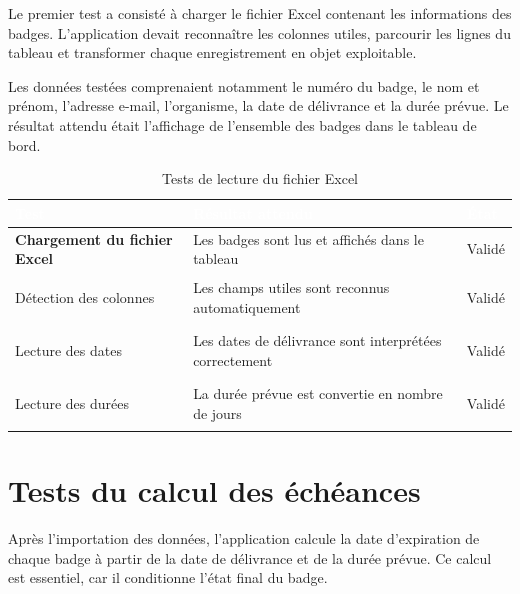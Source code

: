 \documentclass[12pt,a4paper,openany]{report}
\begin{document}
Le premier test a consisté à charger le fichier Excel contenant les informations
des badges. L'application devait reconnaître les colonnes utiles, parcourir les
lignes du tableau et transformer chaque enregistrement en objet exploitable.

Les données testées comprenaient notamment le numéro du badge, le nom et prénom,
l'adresse e-mail, l'organisme, la date de délivrance et la durée prévue. Le
résultat attendu était l'affichage de l'ensemble des badges dans le tableau de
bord.

\begin{table}[H]
\centering
\small
\renewcommand{\arraystretch}{1.5}
\setlength{\arrayrulewidth}{1pt}

\begin{tabularx}{\textwidth}{|>{\raggedright\arraybackslash\bfseries}p{}|>{\raggedright\arraybackslash}X|>{\raggedright\arraybackslash}p{}|}
\hline
\rowcolor{ondaBlue} 
\textcolor{white}{\textbf{Test}} & \textcolor{white}{\textbf{Résultat attendu}} & \textcolor{white}{\textbf{État}} \\
\hline

\rowcolor{ondaBlue!5} 
Chargement du fichier Excel & Les badges sont lus et affichés dans le tableau & Validé \\
\hline

Détection des colonnes & Les champs utiles sont reconnus automatiquement & Validé \\
\hline

\rowcolor{ondaBlue!5} 
Lecture des dates & Les dates de délivrance sont interprétées correctement & Validé \\
\hline

Lecture des durées & La durée prévue est convertie en nombre de jours & Validé \\
\hline

\end{tabularx}
\caption{Tests de lecture du fichier Excel}
\label{tab:tests-excel}
\end{table}

\section{Tests du calcul des échéances}

Après l'importation des données, l'application calcule la date d'expiration de
chaque badge à partir de la date de délivrance et de la durée prévue. Ce calcul
est essentiel, car il conditionne l'état final du badge.
\end{document}
